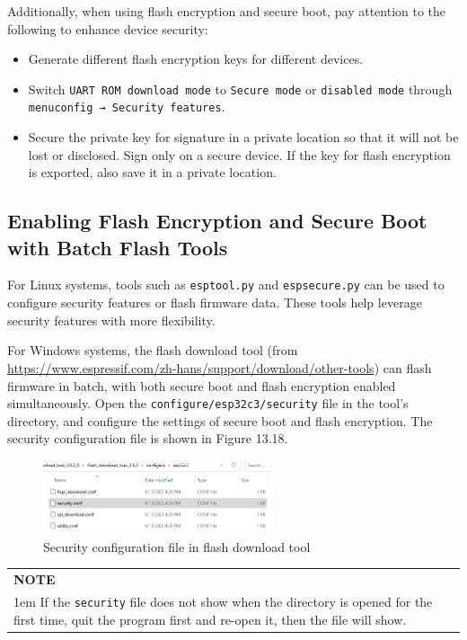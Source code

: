 \documentclass[a4paper,12pt,openany]{book}
\newcommand{\note}[2][NOTE]{ %
\vspace{6pt}
\begin{tabular}{b{\textwidth}}
\hline
\fontfamily{phv}\selectfont \textbf{#1}\\
\leftskip 1em #2\\
\hline
\end{tabular}
}
\begin{document}
Additionally, when using flash encryption and secure boot, pay attention to the following to enhance device security:

\begin{itemize}[leftmargin=1.5em]
    \item Generate different flash encryption keys for different devices.
    \item Switch \verb|UART ROM download mode| to \verb|Secure mode| or \verb|disabled mode| through \verb|menuconfig → Security features|.
    \item Secure the private key for signature in a private location so that it will not be lost or disclosed. Sign only on a secure device. If the key for flash encryption is exported, also save it in a private location.
\end{itemize}

\subsection{Enabling Flash Encryption and Secure Boot with Batch Flash Tools}
For Linux systems, tools such as \verb|esptool.py| and \verb|espsecure.py| can be used to configure security features or flash firmware data. These tools help leverage security features with more flexibility.

For Windows systems, the flash download tool (from \url{https://www.espressif.com/zh-hans/support/download/other-tools}) can flash firmware in batch, with both secure boot and flash encryption enabled simultaneously. Open the \verb|configure/esp32c3/security| file in the tool’s directory, and configure the settings of secure boot and flash encryption. The security configuration file is shown in Figure 13.18.

\begin{figure}[!h]
    \centering
    \includegraphics[width=0.6\textwidth,frame]{D13Z/13-18}
    \caption{Security configuration file in flash download tool}
\end{figure}

\note{If the \texttt{security} file does not show when the directory is opened for the first time, quit the program first and re-open it, then the file will show.}
\end{document}

